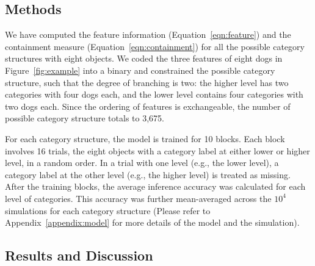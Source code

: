 \documentclass[doc]{apa6}
\DeclareMathOperator*{\argmin}{arg\,min}
\begin{document}



\subsection*{Methods}

We have computed the feature information (Equation~\ref{eqn:feature}) and the containment measure
(Equation~\ref{eqn:containment}) for all the possible category structures with eight objects.  We
coded the three features of eight dogs in Figure~\ref{fig:example} into a binary and constrained the
possible category structure, such that the degree of branching is two: the higher level has two
categories with four dogs each, and the lower level contains four categories with two dogs each.
Since the ordering of features is exchangeable, the number of possible category structure totals to
3,675.

For each category structure, the model is trained for 10 blocks. Each block involves 16 trials, the
eight objects with a category label at either lower or higher level, in a random order.  In a trial
with one level (e.g., the lower level), a category label at the other level (e.g., the higher level)
is treated as missing.  After the training blocks, the average inference accuracy was calculated for
each level of categories.  This accuracy was further mean-averaged across the $10^{4}$ simulations
for each category structure (Please refer to Appendix~\ref{appendix:model} for more details of the
    model and the simulation).


\subsection*{Results and Discussion}
\end{document}
